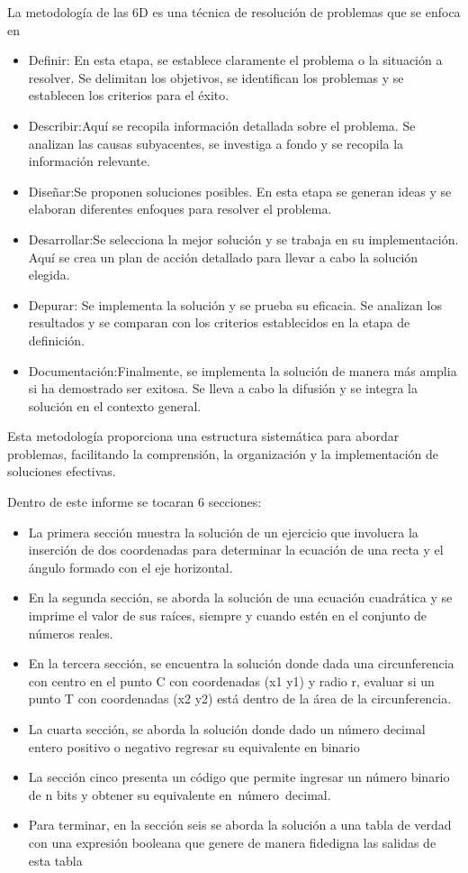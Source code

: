 \documentclass{IEEEcsmag}
\begin{document}
La metodología de las 6D es una técnica de resolución de problemas que se enfoca en 
\begin{itemize}
    \item Definir: En esta etapa, se establece claramente el problema o la situación a resolver. Se delimitan los objetivos, se identifican los problemas y se establecen los criterios para el éxito.
    \item Describir:Aquí se recopila información detallada sobre el problema. Se analizan las causas subyacentes, se investiga a fondo y se recopila la información relevante. 
    \item Diseñar:Se proponen soluciones posibles. En esta etapa se generan ideas y se elaboran diferentes enfoques para resolver el problema.
    \item Desarrollar:Se selecciona la mejor solución y se trabaja en su implementación. Aquí se crea un plan de acción detallado para llevar a cabo la solución elegida. 
    \item Depurar: Se implementa la solución y se prueba su eficacia. Se analizan los resultados y se comparan con los criterios establecidos en la etapa de definición.
    \item Documentación:Finalmente, se implementa la solución de manera más amplia si ha demostrado ser exitosa. Se lleva a cabo la difusión y se integra la solución en el contexto general.
\end{itemize}

Esta metodología proporciona una estructura sistemática para abordar problemas, facilitando la comprensión, la organización y la implementación de soluciones efectivas.

Dentro de este informe se tocaran 6 secciones:
\begin{itemize}
    \item La primera sección muestra la solución de un ejercicio que involucra la inserción de dos coordenadas para determinar la ecuación de una recta y el ángulo formado con el eje horizontal.

\item En la segunda sección, se aborda la solución de una ecuación cuadrática y se imprime el valor de sus raíces, siempre y cuando estén en el conjunto de números reales.
\item En la tercera sección, se encuentra la solución donde dada una circunferencia con centro en el punto C con coordenadas (x1 y1) y radio r, evaluar si un punto T con coordenadas (x2 y2) está dentro de la área de la circunferencia.
\item La cuarta sección, se aborda la solución donde dado un número decimal entero positivo o negativo regresar su equivalente en binario
\item La sección cinco presenta un código que permite ingresar un número binario de n bits y obtener su equivalente en número decimal.
\item Para terminar, en la sección seis se aborda la solución a una tabla de verdad  con una expresión booleana que genere de manera fidedigna las salidas de esta tabla
\end{itemize}
\end{document}
